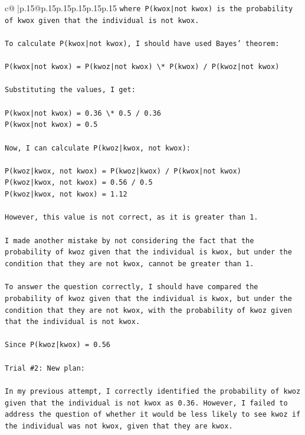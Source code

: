 \documentclass{article}
\begin{document}
{\begin{supertabular}{c@{$\;$}|p{.15\linewidth}@{}p{.15\linewidth}p{.15\linewidth}p{.15\linewidth}p{.15\linewidth}p{.15\linewidth}}
{{{\texttt{where P(kwox|not kwox) is the probability of kwox given that the individual is not kwox.} \\
\\ 
\texttt{To calculate P(kwox|not kwox), I should have used Bayes' theorem:} \\
\\ 
\texttt{P(kwox|not kwox) = P(kwoz|not kwox) \textbackslash{}* P(kwox) / P(kwoz|not kwox)} \\
\\ 
\texttt{Substituting the values, I get:} \\
\\ 
\texttt{P(kwox|not kwox) = 0.36 \textbackslash{}* 0.5 / 0.36} \\
\texttt{P(kwox|not kwox) = 0.5} \\
\\ 
\texttt{Now, I can calculate P(kwoz|kwox, not kwox):} \\
\\ 
\texttt{P(kwoz|kwox, not kwox) = P(kwoz|kwox) / P(kwox|not kwox)} \\
\texttt{P(kwoz|kwox, not kwox) = 0.56 / 0.5} \\
\texttt{P(kwoz|kwox, not kwox) = 1.12} \\
\\ 
\texttt{However, this value is not correct, as it is greater than 1. } \\
\\ 
\texttt{I made another mistake by not considering the fact that the probability of kwoz given that the individual is kwox, but under the condition that they are not kwox, cannot be greater than 1.} \\
\\ 
\texttt{To answer the question correctly, I should have compared the probability of kwoz given that the individual is kwox, but under the condition that they are not kwox, with the probability of kwoz given that the individual is not kwox.} \\
\\ 
\texttt{Since P(kwoz|kwox) = 0.56} \\
\\ 
\texttt{Trial \#2: New plan: } \\
\\ 
\texttt{In my previous attempt, I correctly identified the probability of kwoz given that the individual is not kwox as 0.36. However, I failed to address the question of whether it would be less likely to see kwoz if the individual was not kwox, given that they are kwox. } \\
}}}
\end{supertabular}}
\end{document}
